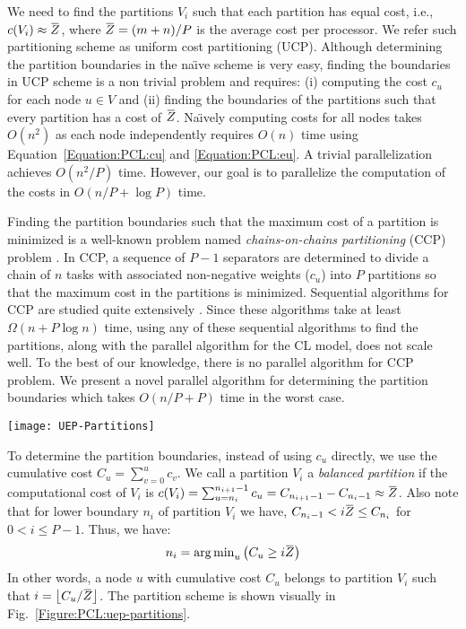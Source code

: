 \documentclass[conference,letterpaper,10pt]{IEEEtran}
\newcommand{\Figure}{Fig.\xspace}
\newcommand{\overbar}[1]{\mkern 1.5mu\overline{\mkern-1.5mu#1\mkern-1.5mu}\mkern 1.5mu}
\DeclareMathOperator*{\argmin}{arg\,min}
\begin{document}
We need to find the partitions $V_{i}$ such that each partition has equal cost, i.e.,  $c(V_i)\approx\overbar{Z}$, where $\overbar{Z}=(m+n)/{P}$ is the average cost per processor. We refer such partitioning scheme as uniform cost partitioning (UCP).
Although determining the partition boundaries in the na\"{\i}ve scheme is very easy, finding the boundaries in UCP scheme is a non trivial problem and requires: (i) computing the cost $c_{u}$ for each node $u\in V$ and (ii) finding the boundaries of the partitions such that every partition has a cost of $\overbar{Z}$. 
Na\"{\i}vely computing costs for all nodes takes $O(n^2)$ as each node independently requires $O(n)$ time using Equation~\ref{Equation:PCL:cu} and \ref{Equation:PCL:eu}. A trivial parallelization achieves $O(n^2/P)$ time. 
However, our goal is to parallelize the computation of the costs in $O(n/{P}+\log{P})$ time.

Finding the partition boundaries such that the maximum cost of a partition is minimized is a well-known problem named \textit{chains-on-chains partitioning} (CCP) problem \cite{Pinar2004}. In CCP, a sequence of $P-1$ separators are determined to divide a chain of $n$ tasks with associated non-negative weights ($c_{u}$) into $P$ partitions so that the maximum cost in the partitions is minimized.
Sequential algorithms for CCP are studied quite extensively \cite{Manne1995,Olstad1995,Pinar2004}. Since these algorithms take at least $\Omega(n+P\log{n})$ time, using any of these sequential algorithms to find the partitions, along with the parallel algorithm for the CL model, does not scale well. To the best of our knowledge, there is no parallel algorithm for CCP problem. We present a novel parallel algorithm for determining the partition boundaries which takes $O(n/P+P)$ time in the worst case.
\begin{figure*}[t]
\centering
\texttt{[image: UEP-Partitions]}
\caption{Uniform cost partitioning (UCP) scheme}
\label{Figure:PCL:uep-partitions}
\end{figure*}

To determine the partition boundaries, instead of using $c_{u}$ directly, we use the cumulative cost $C_{u}=\sum_{v=0}^{u}c_{v}$. We call a partition $V_{i}$ a \textit{balanced partition} if the computational cost of $V_i$ is 
$c(V_i)=\sum_{u=n_{i}}^{n_{i+1}-1}c_{u}= C_{n_{i+1}-1} - C_{n_{i}-1}\approx\overbar{Z}$. 
Also note that for lower boundary $n_{i}$ of partition $V_{i}$ we have, $C_{n_i-1} < i\overbar{Z} \leq C_{n_i}$ for $0 < i \leq P-1$. Thus, we have:
\begin{equation}
\textstyle n_i = {\argmin_{u} \left( C_{u} \geq i\overbar{Z} \right)} \label{Equation:PCL:Partition-Boundary}
\end{equation}
In other words, a node $u$ with cumulative cost $C_{u}$ belongs to partition $V_i$ such that $i={\left\lfloor C_{u}/\overbar{Z}\right\rfloor}$. The partition scheme is shown visually in \Figure~\ref{Figure:PCL:uep-partitions}.
\end{document}
